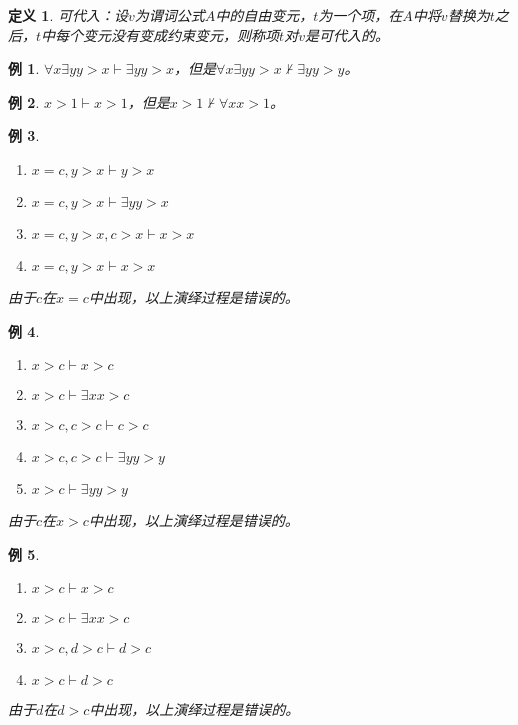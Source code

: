 \documentclass{article}
\newtheorem{Def}{定义}
\newtheorem*{Example}{例}
\begin{document}
\begin{CJK*}{UTF8}{gbsn}
  \begin{Def}
    可代入：设$v$为谓词公式$A$中的自由变元，$t$为一个项，在$A$中将$v$替换为$t$之后，$t$中每个变元没有变成约束变元，则称项$t$对$v$是可代入的。
  \end{Def}


  \begin{Example}
    $\forall x \exists y y>x \vdash \exists y y > x$，但是$ \forall x \exists y y>x \nvdash  \exists y y > y$。
  \end{Example}

  \begin{Example}
    $x>1\vdash x>1$，但是$x>1\nvdash \forall x x>1$。
  \end{Example}

  \begin{Example}

    $\quad$

    \begin{enumerate}
      \item $x=c,y>x\vdash y>x$
      \item $x=c, y>x \vdash \exists y y >x$
      \item $x=c, y>x, c>x\vdash x>x$
      \item $x=c, y>x \vdash x>x$
    \end{enumerate}
    由于$c$在$x=c$中出现，以上演绎过程是错误的。
  \end{Example}

  \begin{Example}
    $\quad$

    \begin{enumerate}
      \item $x>c\vdash x>c$
      \item $x>c\vdash \exists x x>c$
      \item $x>c, c>c\vdash c>c$
      \item $x>c, c>c \vdash \exists y y>y$
      \item $x>c\vdash \exists y y>y$
    \end{enumerate}
    由于$c$在$x>c$中出现，以上演绎过程是错误的。
  \end{Example}

  \begin{Example}

    $\quad$

    \begin{enumerate}
      \item $x>c\vdash x>c$
      \item $x>c\vdash \exists x x>c$
      \item $x>c, d>c \vdash d>c$
      \item $x>c\vdash d>c$
    \end{enumerate}
    由于$d$在$d>c$中出现，以上演绎过程是错误的。
  \end{Example}


\end{CJK*}
\end{document}
